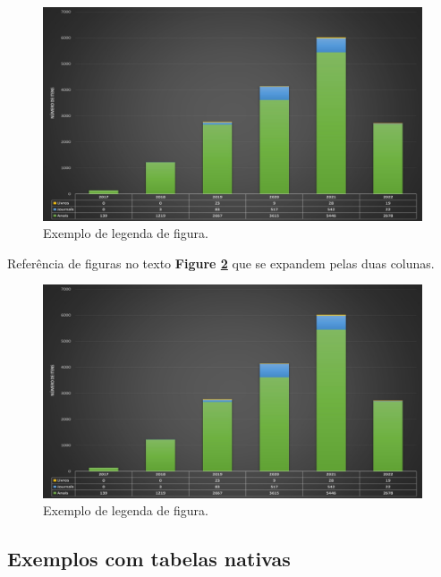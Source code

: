 \begin{figure}
\begin{center}
\includegraphics[width=\columnwidth]{imagens/sol.jpg}
\caption{Exemplo de legenda de figura.}\label{Fig1}
\end{center}
\end{figure}

Referência de figuras no texto \textbf{Figure \ref{Fig2}} que se expandem pelas duas colunas.

\begin{figure}
\begin{center}
\includegraphics[width=30pc]{imagens/sol.jpg}
\caption{{Exemplo de legenda de figura.}}
 \label{Fig2}
\end{center}
\end{figure}



\subsection{Exemplos com tabelas nativas}


